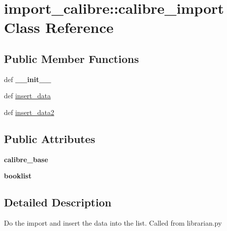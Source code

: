 \hypertarget{classimport__calibre_1_1calibre__import}{
\section{import\_\-calibre::calibre\_\-import Class Reference}
\label{classimport__calibre_1_1calibre__import}
}
\subsection*{Public Member Functions}
\begin{DoxyCompactItemize}
\item 
\hypertarget{classimport__calibre_1_1calibre__import_a9b82d00f229c13d2bbeabc643b5730ef}{
def {\bfseries \_\-\_\-init\_\-\_\-}}
\label{classimport__calibre_1_1calibre__import_a9b82d00f229c13d2bbeabc643b5730ef}

\item 
def \hyperlink{classimport__calibre_1_1calibre__import_ae57170f369aeb52fcd6f507fdb698487}{insert\_\-data}
\item 
def \hyperlink{classimport__calibre_1_1calibre__import_a4af0c966182597de5b9cb1555f2cdcba}{insert\_\-data2}
\end{DoxyCompactItemize}
\subsection*{Public Attributes}
\begin{DoxyCompactItemize}
\item 
\hypertarget{classimport__calibre_1_1calibre__import_af13c5043fd4e94f7e2da5fcc75ca8872}{
{\bfseries calibre\_\-base}}
\label{classimport__calibre_1_1calibre__import_af13c5043fd4e94f7e2da5fcc75ca8872}

\item 
\hypertarget{classimport__calibre_1_1calibre__import_a5acd4bfb20651ac9ec249b65cefab43b}{
{\bfseries booklist}}
\label{classimport__calibre_1_1calibre__import_a5acd4bfb20651ac9ec249b65cefab43b}

\end{DoxyCompactItemize}


\subsection{Detailed Description}
\begin{DoxyVerb}Do the import and insert the data into the list.
Called from librarian.py

\end{DoxyVerb}
 

